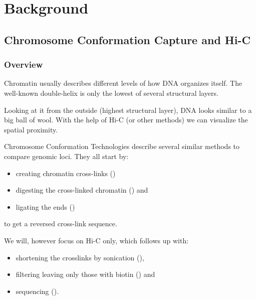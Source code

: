 \chapter{Background}\label{chap:background}
% 
% 

\section{Chromosome Conformation Capture and Hi-C}\label{sec:c3}\label{sec:hic}



\subsection{Overview}


Chromatin usually describes different levels of how DNA organizes itself. The
well-known double-helix is only the lowest of several structural layers.

Looking at it from the outside (highest structural layer), DNA looks similar to
a big ball of wool. With the help of Hi-C (or other methods) we can visualize
the spatial proximity.




Chromosome Conformation Technologies describe several similar methods to
compare genomic loci. They all start by:

\begin{itemize}
    \item creating chromatin cross-links ()
    \item digesting the cross-linked chromatin () and
    \item ligating the ends ()
\end{itemize}

to get a reversed cross-link sequence.

We will, however focus on Hi-C only, which follows up with:

\begin{itemize}
    \item shortening the crosslinks by sonication (),
    \item filtering leaving only those with biotin () and
    \item sequencing ().
\end{itemize}

